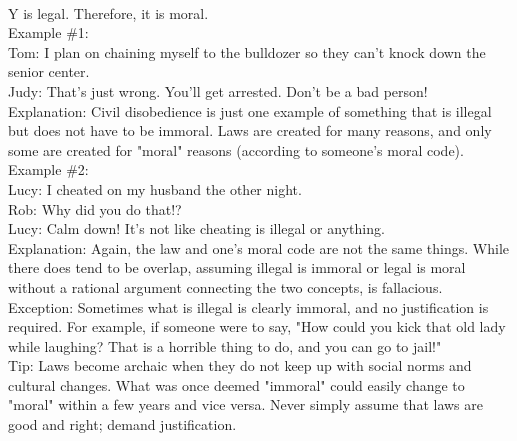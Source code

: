 \documentclass[a4paper,12pt,single,pdftex]{scrartcl}
\begin{document}
    
      
    \\

    
      Y is legal. Therefore, it is moral.
    \\

    
      Example \#1:
    \\

    
      Tom: I plan on chaining myself to the bulldozer so they can't knock down the senior center.
    \\

    
      Judy: That's just wrong. You'll get arrested. Don't be a bad person!
    \\

    
      Explanation: Civil disobedience is just one example of something that is illegal but does not have to be immoral. Laws are created for many reasons, and only some are created for "moral" reasons (according to someone's moral code).
    \\

    
      Example \#2:
    \\

    
      Lucy: I cheated on my husband the other night.
    \\

    
      Rob: Why did you do that!?
    \\

    
      Lucy: Calm down! It's not like cheating is illegal or anything.
    \\

    
      Explanation: Again, the law and one's moral code are not the same things. While there does tend to be overlap, assuming illegal is immoral or legal is moral without a rational argument connecting the two concepts, is fallacious.
    \\

    
      Exception: Sometimes what is illegal is clearly immoral, and no justification is required. For example, if someone were to say, "How could you kick that old lady while laughing? That is a horrible thing to do, and you can go to jail!"
    \\

    
      Tip: Laws become archaic when they do not keep up with social norms and cultural changes. What was once deemed "immoral" could easily change to "moral" within a few years and vice versa. Never simply assume that laws are good and right; demand justification.
    \\
\end{document}
